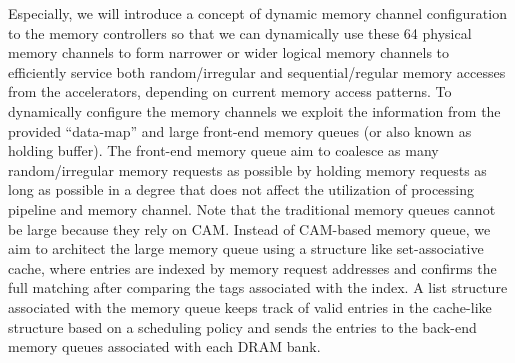 Especially, we will introduce a concept of dynamic memory channel configuration to the memory controllers so that we can dynamically use these 64 physical memory channels to form narrower or wider logical memory channels to efficiently service both random/irregular and sequential/regular memory accesses from the accelerators, depending on current memory access patterns. 
To dynamically configure the memory channels we exploit the information from the provided ``data-map'' and large front-end memory queues (or also known as holding buffer).
The front-end memory queue aim to coalesce as many random/irregular memory requests as possible by holding memory requests as long as possible in a degree that does not affect the utilization of processing pipeline and memory channel.
Note that the traditional memory queues cannot be large because they rely on CAM.
Instead of CAM-based memory queue, we aim to architect the large memory queue using a structure like set-associative cache, where entries are indexed by memory request addresses and confirms the full matching after comparing the tags associated with the index.
A list structure associated with the memory queue keeps track of valid entries in the cache-like structure based on a scheduling policy and sends the entries to the back-end memory queues associated with each DRAM bank.
